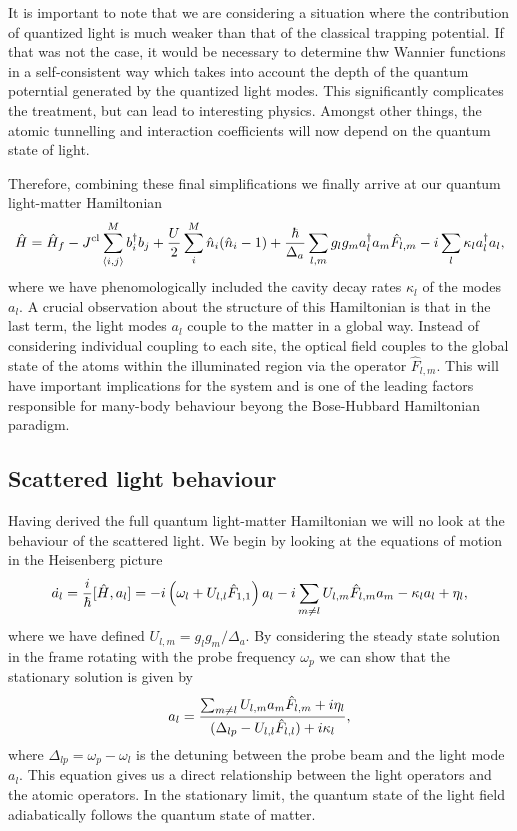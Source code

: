 It is important to note that we are considering a situation where the
contribution of quantized light is much weaker than that of the
classical trapping potential. If that was not the case, it would be
necessary to determine thw Wannier functions in a self-consistent way
which takes into account the depth of the quantum poterntial generated
by the quantized light modes. This significantly complicates the
treatment, but can lead to interesting physics. Amongst other things,
the atomic tunnelling and interaction coefficients will now depend on
the quantum state of light.

Therefore, combining these final simplifications we finally arrive at
our quantum light-matter Hamiltonian
\begin{equation}
  \hat{H} = \hat{H}_f -J^\mathrm{cl} \sum_{\langle i,j \rangle}^M b^\dagger_i b_j + 
  \frac{U}{2} \sum_{i}^M \hat{n}_i (\hat{n}_i - 1) + 
  \frac{\hbar}{\Delta_a} \sum_{l,m} g_l g_m a^\dagger_l a_m \hat{F}_{l,m} -
  i \sum_l \kappa_l a^\dagger_l a_l,
\end{equation}
where we have phenomologically included the cavity decay rates
$\kappa_l$ of the modes $a_l$. A crucial observation about the
structure of this Hamiltonian is that in the last term, the light
modes $a_l$ couple to the matter in a global way. Instead of
considering individual coupling to each site, the optical field
couples to the global state of the atoms within the illuminated region
via the operator $\hat{F}_{l,m}$. This will have important
implications for the system and is one of the leading factors
responsible for many-body behaviour beyong the Bose-Hubbard
Hamiltonian paradigm.

\subsection{Scattered light behaviour}

Having derived the full quantum light-matter Hamiltonian we will no
look at the behaviour of the scattered light. We begin by looking at
the equations of motion in the Heisenberg picture
\begin{equation}
  \dot{a_l} = \frac{i}{\hbar} [\hat{H}, a_l] = 
  -i \left(\omega_l + U_{l,l}\hat{F}_{1,1} \right) a_l
   - i \sum_{m \ne l} U_{l,m} \hat{F}_{l,m} a_m
    - \kappa_l a_l + \eta_l,
\end{equation}
where we have defined $U_{l,m} = g_l g_m / \Delta_a$. By considering
the steady state solution in the frame rotating with the probe
frequency $\omega_p$ we can show that the stationary solution is given
by
\begin{equation}
  a_l = \frac{\sum_{m \ne l} U_{l,m} a_m \hat{F}_{l,m} + i \eta_l} 
  {(\Delta_{lp} - U_{l,l} \hat{F}_{l,l}) + i \kappa_l},
\end{equation}
where $\Delta_{lp} = \omega_p - \omega_l$ is the detuning between the
probe beam and the light mode $a_l$. This equation gives us a direct
relationship between the light operators and the atomic operators. In
the stationary limit, the quantum state of the light field
adiabatically follows the quantum state of matter.

